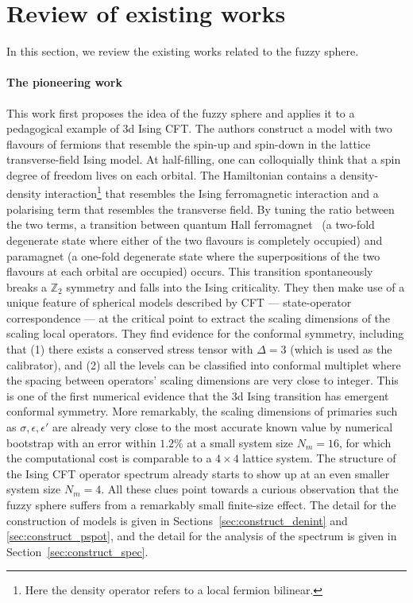 \documentclass{timesjhep}
\begin{document}
\section{Review of existing works}
\label{sec:review}

In this section, we review the existing works related to the fuzzy sphere. 

\paragraph{The pioneering work~\cite{Zhu2022}}

This work first proposes the idea of the fuzzy sphere and applies it to a pedagogical example of 3d Ising CFT. The authors construct a model with two flavours of fermions that resemble the spin-up and spin-down in the lattice transverse-field Ising model. At half-filling, one can colloquially think that a spin degree of freedom lives on each orbital. The Hamiltonian contains a density-density interaction\footnote{Here the density operator refers to a local fermion bilinear.} that resembles the Ising ferromagnetic interaction and a polarising term that resembles the transverse field. By tuning the ratio between the two terms, a transition between quantum Hall ferromagnet~\cite{Pasquier2000HallFM,Girvin2010HallFM} (a two-fold degenerate state where either of the two flavours is completely occupied) and paramagnet (a one-fold degenerate state where the superpositions of the two flavours at each orbital are occupied) occurs. This transition spontaneously breaks a $\mathbb{Z}_2$ symmetry and falls into the Ising criticality. They then make use of a unique feature of spherical models described by CFT --- state-operator correspondence --- at the critical point to extract the scaling dimensions of the scaling local operators. They find evidence for the conformal symmetry, including that (1) there exists a conserved stress tensor with $\Delta=3$ (which is used as the calibrator), and (2) all the levels can be classified into conformal multiplet where the spacing between operators' scaling dimensions are very close to integer. This is one of the first numerical evidence that the 3d Ising transition has emergent conformal symmetry. More remarkably, the scaling dimensions of primaries such as $\sigma,\epsilon,\epsilon'$ are already very close to the most accurate known value by numerical bootstrap with an error within $1.2\%$ at a small system size $N_m=16$, for which the computational cost is comparable to a $4\times4$ lattice system. The structure of the Ising CFT operator spectrum already starts to show up at an even smaller system size $N_m=4$. All these clues point towards a curious observation that the fuzzy sphere suffers from a remarkably small finite-size effect. The detail for the construction of models is given in Sections~\ref{sec:construct_denint} and \ref{sec:construct_pspot}, and the detail for the analysis of the spectrum is given in Section~\ref{sec:construct_spec}.
\end{document}
